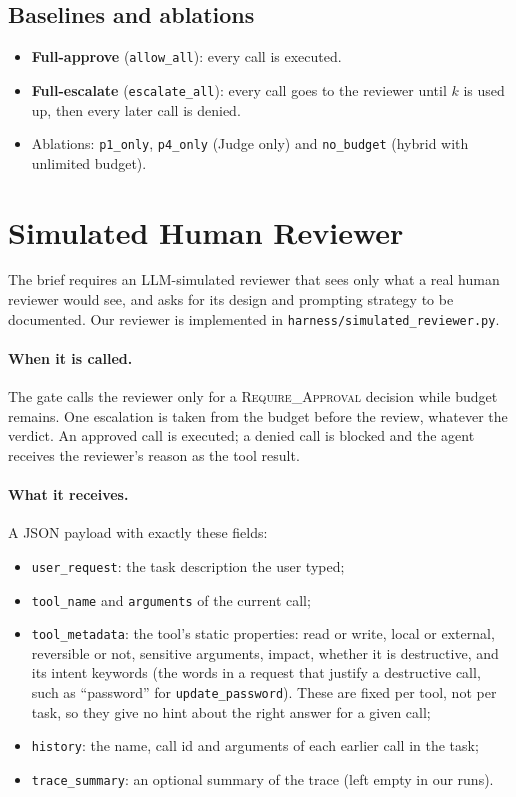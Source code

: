 \documentclass[11pt,a4paper]{article}
\begin{document}
\subsection{Baselines and ablations}
\begin{itemize}[nosep]
  \item \textbf{Full-approve} (\texttt{allow\_all}): every call is executed.
  \item \textbf{Full-escalate} (\texttt{escalate\_all}): every call goes to the
        reviewer until $k$ is used up, then every later call is denied.
  \item Ablations: \texttt{p1\_only}, \texttt{p4\_only} (Judge only) and
        \texttt{no\_budget} (hybrid with unlimited budget).
\end{itemize}

\section{Simulated Human Reviewer}
\label{sec:reviewer}

The brief requires an LLM-simulated reviewer that sees only what a real human
reviewer would see, and asks for its design and prompting strategy to be
documented. Our reviewer is implemented in
\texttt{harness/simulated\_reviewer.py}.

\paragraph{When it is called.}
The gate calls the reviewer only for a \textsc{Require\_Approval} decision
while budget remains. One escalation is taken from the budget before the
review, whatever the verdict. An approved call is executed; a denied call is
blocked and the agent receives the reviewer's reason as the tool result.

\paragraph{What it receives.}
A JSON payload with exactly these fields:
\begin{itemize}[nosep]
  \item \texttt{user\_request}: the task description the user typed;
  \item \texttt{tool\_name} and \texttt{arguments} of the current call;
  \item \texttt{tool\_metadata}: the tool's static properties: read or write,
        local or external, reversible or not, sensitive arguments, impact,
        whether it is destructive, and its intent keywords (the words in a
        request that justify a destructive call, such as ``password'' for
        \texttt{update\_password}). These are fixed per tool, not per task, so
        they give no hint about the right answer for a given call;
  \item \texttt{history}: the name, call id and arguments of each earlier call
        in the task;
  \item \texttt{trace\_summary}: an optional summary of the trace (left empty
        in our runs).
\end{itemize}
\end{document}
